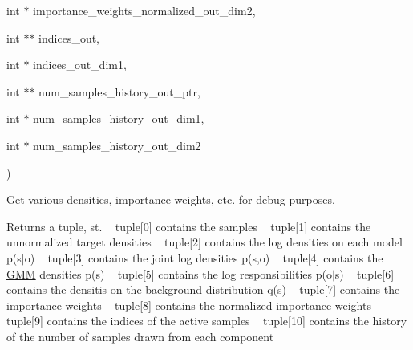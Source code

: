 {\begin{DoxyParamCaption}
\item[{int $\ast$}]{importance\+\_\+weights\+\_\+normalized\+\_\+out\+\_\+dim2, }
\item[{int $\ast$$\ast$}]{indices\+\_\+out, }
\item[{int $\ast$}]{indices\+\_\+out\+\_\+dim1, }
\item[{int $\ast$$\ast$}]{num\+\_\+samples\+\_\+history\+\_\+out\+\_\+ptr, }
\item[{int $\ast$}]{num\+\_\+samples\+\_\+history\+\_\+out\+\_\+dim1, }
\item[{int $\ast$}]{num\+\_\+samples\+\_\+history\+\_\+out\+\_\+dim2}
\end{DoxyParamCaption}
)}\hypertarget{classVIPS__PythonWrapper_a64a647b24326d512082dbb60932eaa29}{}\label{classVIPS__PythonWrapper_a64a647b24326d512082dbb60932eaa29}
Get various densities, importance weights, etc. for debug purposes. \begin{DoxyReturn}{Returns}
a tuple, st. ~\newline
 tuple\mbox{[}0\mbox{]} contains the samples ~\newline
 tuple\mbox{[}1\mbox{]} contains the unnormalized target densities ~\newline
 tuple\mbox{[}2\mbox{]} contains the log densities on each model p(s$\vert$o) ~\newline
 tuple\mbox{[}3\mbox{]} contains the joint log densities p(s,o) ~\newline
 tuple\mbox{[}4\mbox{]} contains the \hyperlink{classGMM}{G\+MM} densities p(s) ~\newline
 tuple\mbox{[}5\mbox{]} contains the log responsibilities p(o$\vert$s) ~\newline
 tuple\mbox{[}6\mbox{]} contains the densitis on the background distribution q(s) ~\newline
 tuple\mbox{[}7\mbox{]} contains the importance weights ~\newline
 tuple\mbox{[}8\mbox{]} contains the normalized importance weights ~\newline
 tuple\mbox{[}9\mbox{]} contains the indices of the active samples ~\newline
 tuple\mbox{[}10\mbox{]} contains the history of the number of samples drawn from each component 
\end{DoxyReturn}
